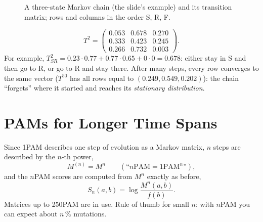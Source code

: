 \documentclass[11pt, oneside]{book}
\let\originalsection\section
\renewcommand{\section}{\Needspace{7\baselineskip}\originalsection}
\begin{document}
\begin{figure}[htbp]
\centering
{}
\caption{A three-state Markov chain (the slide's example) and its transition
matrix; rows and columns in the order S, R, F.}
\label{fig:markov}
\end{figure}

\begin{exbox}[title={Two steps}]
\[
  T^2 = \begin{pmatrix} 0.053 & 0.678 & 0.270 \\ 0.333 & 0.423 & 0.245 \\ 0.266 & 0.732 & 0.003 \end{pmatrix}.
\]
For example, $T^2_{SR} = 0.23 \cdot 0.77 + 0.77 \cdot 0.65 + 0 \cdot 0 = 0.678$:
either stay in S and then go to R, or go to R and stay there. After many
steps, every row converges to the same vector ($T^{50}$ has all rows equal to
$(0.249, 0.549, 0.202)$): the chain ``forgets'' where it started and reaches
its \emph{stationary distribution}.
\end{exbox}

\section{PAMs for Longer Time Spans}

\begin{thmbox}[title={$n$PAM}]
Since 1PAM describes one step of evolution as a Markov matrix, $n$ steps are
described by the $n$-th power,
\[
  M^{(n)} = M^{n} \qquad (\text{``}n\text{PAM} = 1\text{PAM}^n\text{''}),
\]
and the $n$PAM scores are computed from $M^n$ exactly as before,
\[
  S_n(a,b) = \log\frac{M^n(a,b)}{f(b)} .
\]
Matrices up to 250PAM are in use.
Rule of thumb for small $n$: with $n$PAM you can expect about $n\,\%$
mutations.
\end{thmbox}
\end{document}
